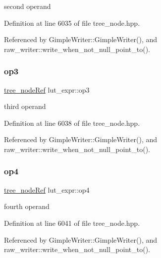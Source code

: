 second operand 



Definition at line 6035 of file tree\+\_\+node.\+hpp.



Referenced by Gimple\+Writer\+::\+Gimple\+Writer(), and raw\+\_\+writer\+::write\+\_\+when\+\_\+not\+\_\+null\+\_\+point\+\_\+to().

\mbox{\label{structlut__expr_ad424c166eec1259d24d10e0154fa047d}} 
\subsubsection{\texorpdfstring{op3}{op3}}
{\footnotesize\ttfamily \hyperlink{tree__node_8hpp_a6ee377554d1c4871ad66a337eaa67fd5}{tree\+\_\+node\+Ref} lut\+\_\+expr\+::op3}



third operand 



Definition at line 6038 of file tree\+\_\+node.\+hpp.



Referenced by Gimple\+Writer\+::\+Gimple\+Writer(), and raw\+\_\+writer\+::write\+\_\+when\+\_\+not\+\_\+null\+\_\+point\+\_\+to().

\mbox{\label{structlut__expr_a5e43041e6c7749c0a1c53964b779492a}} 
\subsubsection{\texorpdfstring{op4}{op4}}
{\footnotesize\ttfamily \hyperlink{tree__node_8hpp_a6ee377554d1c4871ad66a337eaa67fd5}{tree\+\_\+node\+Ref} lut\+\_\+expr\+::op4}



fourth operand 



Definition at line 6041 of file tree\+\_\+node.\+hpp.



Referenced by Gimple\+Writer\+::\+Gimple\+Writer(), and raw\+\_\+writer\+::write\+\_\+when\+\_\+not\+\_\+null\+\_\+point\+\_\+to().

\mbox{\label{structlut__expr_a76f781a8efea8838672e0c9a77bbde5c}} 
